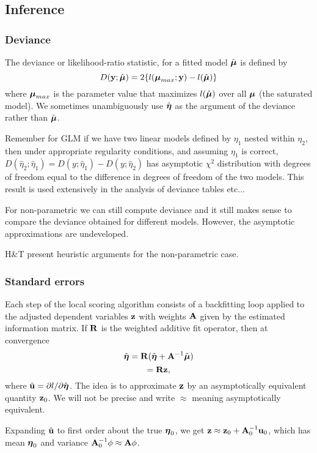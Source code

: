 \subsection{Inference}
\subsubsection{Deviance}
The deviance or likelihood-ratio statistic, for a fitted model
$\hat{\mbox{\boldmath $\mu$\unboldmath}}$ is defined by 
\[
D({\mathbf y};\hat{\mbox{\boldmath $\mu$\unboldmath}}) = 2\{l(\mbox{\boldmath $\mu$\unboldmath}_{max}; {\mathbf y}) - l(\hat{\mbox{\boldmath $\mu$\unboldmath}})\}
\]
where $\mbox{\boldmath $\mu$\unboldmath}_{max}$ is the parameter value that maximizes
$l(\hat{\mbox{\boldmath $\mu$\unboldmath}})$ over all $\mbox{\boldmath $\mu$\unboldmath}$ (the saturated model). We
sometimes unambiguously use $\hat{\mbox{\boldmath $\eta$\unboldmath}}$ as the argument of the
deviance rather than $\hat{\mbox{\boldmath $\mu$\unboldmath}}$. 

Remember for GLM if we have two linear models defined by $\eta_1$
nested within $\eta_2$, then under appropriate regularity conditions,
and assuming $\eta_1$ is correct, $D(\hat{\eta}_2;\hat{\eta}_1) =
D(y;\hat{\eta}_1) - D(y;\hat{\eta}_2)$ has asymptotic $\chi^2$
distribution with degrees of freedom equal to the difference in
degrees of freedom of the two models. This result is used extensively
in the analysis of deviance tables etc...

For non-parametric we can still compute deviance and it still makes
sense to compare the deviance obtained for different models. However,
the asymptotic approximations are undeveloped. 

H\&T present heuristic arguments for  the non-parametric case.

\subsubsection{Standard errors}
Each step of the local scoring algorithm consists of a backfitting
loop applied to the adjusted dependent variables ${\mathbf z}$ with weights
${\mathbf A}$ given by the estimated information matrix. If ${\mathbf R}$ is the
weighted additive fit operator, then at convergence
\[
\hat{\mbox{\boldmath $\eta$\unboldmath}} = {\mathbf R}(\hat{\mbox{\boldmath $\eta$\unboldmath}} + {\mathbf A}^{-1}\hat{\mbox{\boldmath $\mu$\unboldmath}})
\]
\[
= {\mathbf R} {\mathbf z},
\]
where $\hat{{\mathbf u}} = \partial l / \partial \hat{\mbox{\boldmath $\eta$\unboldmath}}$. The
idea is to approximate ${\mathbf z}$ by an asymptotically equivalent quantity
${\mathbf z}_0$. We will not be precise and write $\approx$ meaning
asymptotically equivalent.

Expanding $\hat{{\mathbf u}}$ to first order about the true
$\mbox{\boldmath $\eta$\unboldmath}_0$, we get ${\mathbf z} \approx {\mathbf z}_0 + {\mathbf A}_0^{-1}{\mathbf u}_0$, which has
mean $\mbox{\boldmath $\eta$\unboldmath}_0$ and variance ${\mathbf A}_0^{-1} \phi \approx {\mathbf A}
\phi$. 

